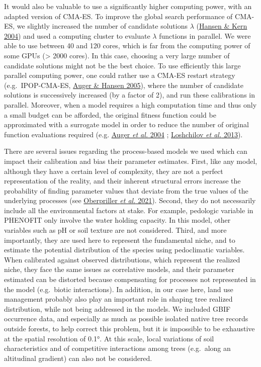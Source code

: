 \documentclass[11pt,]{article}
\begin{document}
It would also be valuable to use a significantly higher computing power,
with an adapted version of CMA-ES. To improve the global search
performance of CMA-ES, we slightly increased the number of candidate
solutions \(\lambda\) (\protect\hyperlink{ref-Hansen2004}{Hansen \& Kern
2004}) and used a computing cluster to evaluate \(\lambda\) functions in
parallel. We were able to use between 40 and 120 cores, which is far
from the computing power of some GPUs (\textgreater{} 2000 cores). In
this case, choosing a very large number of candidate solutions might not
be the best choice. To use efficiently this large parallel computing
power, one could rather use a CMA-ES restart strategy (e.g.~IPOP-CMA-ES,
\protect\hyperlink{ref-Auger2005}{Auger \& Hansen 2005}), where the
number of candidate solutions is successively increased (by a factor of
2), and run these calibrations in parallel. Moreover, when a model
requires a high computation time and thus only a small budget can be
afforded, the original fitness function could be approximated with a
surrogate model in order to reduce the number of original function
evaluations required (e.g. \protect\hyperlink{ref-Auger2004}{Auger
\emph{et al.} 2004} ; \protect\hyperlink{ref-Loshchilov2013}{Loshchilov
\emph{et al.} 2013}).

There are several issues regarding the process-based models we used
which can impact their calibration and bias their parameter estimates.
First, like any model, although they have a certain level of complexity,
they are not a perfect representation of the reality, and their inherent
structural errors increase the probability of finding parameter values
that deviate from the true values of the underlying processes (see
\protect\hyperlink{ref-Oberpriller2021}{Oberpriller \emph{et al.}
2021}). Second, they do not necessarily include all the environmental
factors at stake. For example, pedologic variable in PHENOFIT only
involve the water holding capacity. In this model, other variables such
as pH or soil texture are not considered. Third, and more importantly,
they are used here to represent the fundamental niche, and to estimate
the potential distribution of the species using pedoclimatic variables.
When calibrated against observed distributions, which represent the
realized niche, they face the same issues as correlative models, and
their parameter estimated can be distorted because compensating for
processes not represented in the model (e.g.~biotic interactions). In
addition, in our case here, land use management probably also play an
important role in shaping tree realized distribution, while not being
addressed in the models. We included GBIF occurrence data, and
especially as much as possible isolated native tree records outside
forests, to help correct this problem, but it is impossible to be
exhaustive at the spatial resolution of 0.1°. At this scale, local
variations of soil characteristics and of competitive interactions among
trees (e.g.~along an altitudinal gradient) can also not be considered.
\end{document}
